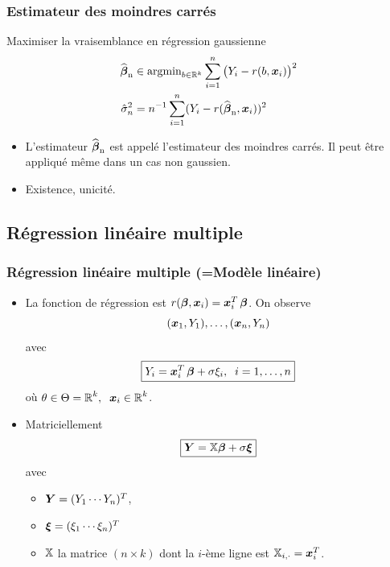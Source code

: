 \begin{frame}
\frametitle{Estimateur des moindres carrés}
Maximiser la
\alert{ vraisemblance} en régression gaussienne
\begin{align*}
\operatorname{\widehat{\boldsymbol{\beta}}_n} &\in \mathrm{argmin}_{b \in \mathbb{R}^k} \sum_{i = 1}^n \big(Y_i-r(b,\operatorname{\boldsymbol{x}}_i)\big)^2 \\
\hat{\sigma}_n^2 &= n^{-1} \sum_{i=1}^n (Y_i - r(\operatorname{\widehat{\boldsymbol{\beta}}_n},\operatorname{\boldsymbol{x}}_i))^2
\end{align*}
\begin{itemize}
\item  L'estimateur $\operatorname{\widehat{\boldsymbol{\beta}}_n}$ est appelé l'\alert{estimateur des moindres carrés}. Il peut être appliqué même dans un cas non gaussien.
\item \alert{ Existence, unicité.}
\end{itemize}
\end{frame}


\subsection{Régression linéaire multiple}

\begin{frame}
\frametitle{Régression linéaire multiple (=Modèle linéaire)}
\begin{itemize}
\item La fonction de régression est $r(\boldsymbol{\beta},\operatorname{\boldsymbol{x}}_i) = \operatorname{\boldsymbol{x}}_i^T \boldsymbol{\beta}$.
On observe
$$(\operatorname{\boldsymbol{x}}_1,Y_1),\ldots, (\operatorname{\boldsymbol{x}}_n,Y_n)$$
avec
$$\boxed{Y_i = \operatorname{\boldsymbol{x}}_i^T \boldsymbol{\beta}+ \sigma \xi_i,\;\;i=1,\ldots, n}$$
où $\theta \in \Theta = \operatorname{{\mathbb R}}^k,\;\;\operatorname{\boldsymbol{x}}_i \in \operatorname{{\mathbb R}}^k$.
\item \alert{Matriciellement}
$$\boxed{\operatorname{\boldsymbol{Y}} = \mathbb{X}\boldsymbol{\beta} + \sigma \boldsymbol{\xi}}$$
avec
\begin{itemize}
\item \alert<1>{$\operatorname{\boldsymbol{Y}} = (Y_1 \cdots Y_n)^T$},
\item \alert<2>{$\boldsymbol{\xi} = (\xi_1 \cdots \xi_n)^T$}
\item \alert<3>{$\mathbb{X}$ la matrice $(n\times k)$
dont la $i$-ème ligne est $\mathbb{X}_{i,\cdot}= \operatorname{\boldsymbol{x}}_i^T$.}
\end{itemize}
\end{itemize}
\end{frame}

